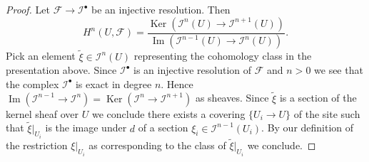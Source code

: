 \documentclass[10pt,a4paper]{amsart}
\theoremstyle{plain}
\theoremstyle{definition}
\theoremstyle{remark}
\numberwithin{equation}{subsection}
\def\Ker{\mathop{\mathrm{Ker}}}
\def\Im{\mathop{\mathrm{Im}}}
\begin{document}
\begin{proof}
Let $\mathcal{F} \to \mathcal{I}^\bullet$ be an injective resolution.
Then
$$
H^n(U, \mathcal{F}) =
\frac{\Ker(\mathcal{I}^n(U) \to \mathcal{I}^{n + 1}(U))}
{\Im(\mathcal{I}^{n - 1}(U) \to \mathcal{I}^n(U))}.
$$
Pick an element $\tilde \xi \in \mathcal{I}^n(U)$ representing the
cohomology class in the presentation above. Since $\mathcal{I}^\bullet$
is an injective resolution of $\mathcal{F}$ and $n > 0$ we see that
the complex $\mathcal{I}^\bullet$ is exact in degree $n$. Hence
$\Im(\mathcal{I}^{n - 1} \to \mathcal{I}^n) =
\Ker(\mathcal{I}^n \to \mathcal{I}^{n + 1})$ as sheaves.
Since $\tilde \xi$ is a section of the kernel sheaf over $U$
we conclude there exists a covering $\{U_i \to U\}$ of the site
such that $\tilde \xi|_{U_i}$ is the image under $d$ of a section
$\xi_i \in \mathcal{I}^{n - 1}(U_i)$. By our definition of the
restriction $\xi|_{U_i}$ as corresponding to the class of
$\tilde \xi|_{U_i}$ we conclude.
\end{proof}
\end{document}
